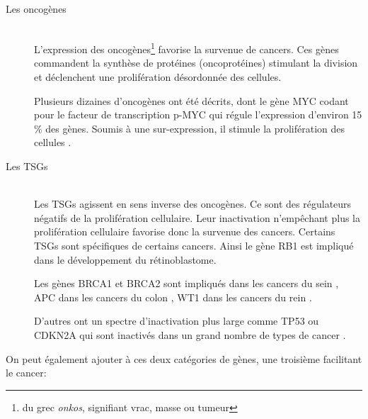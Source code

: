 			\begin{description}
				\item [Les oncogènes] \hfill \\
					L'expression des oncogènes\footnote{du grec \emph{onkos}, signifiant vrac, masse ou tumeur} favorise la survenue de cancers.
					Ces gènes commandent la synthèse de protéines (oncoprotéines) stimulant la division et déclenchent une prolifération désordonnée des cellules.

					Plusieurs dizaines d'oncogènes ont été décrits, dont le gène \acs{MYC} codant pour le facteur de transcription \acs{p-MYC} qui régule l'expression d'environ 15 \% des gènes.
					Soumis à une sur-expression, il stimule la prolifération des cellules \citep{Li2003}.

				\item [Les \acp{TSG}] \hfill \\
					Les \acp{TSG} agissent en sens inverse des oncogènes.
					Ce sont des régulateurs négatifs de la prolifération cellulaire.
					Leur inactivation n'empêchant plus la prolifération cellulaire favorise donc la survenue des cancers.
					Certains \acp{TSG} sont spécifiques de certains cancers.
					Ainsi le gène \acs{RB1} est impliqué dans le développement du rétinoblastome.

					Les gènes \acs{BRCA1} et \acs{BRCA2} sont impliqués dans les cancers du sein \citep{Hall1990}, \acs{APC} dans les cancers du colon \citep{Nishisho1991}, \acs{WT1} dans les cancers du rein \citep{Little1992}.

					D'autres ont un spectre d'inactivation plus large comme \acs{TP53} ou \acs{CDKN2A} qui sont inactivés dans un grand nombre de types de cancer \citep{Caldas1994,Jiang2011,Wang2011a,Piao2011,Alawadi2011,Sonoyama2011,Igaki1994}.

			\end{description}

			On peut également ajouter à ces deux catégories de gènes, une troisième facilitant le cancer:

